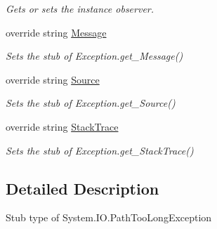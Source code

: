 \begin{DoxyCompactItemize}
\begin{DoxyCompactList}\small\item\em Gets or sets the instance observer.\end{DoxyCompactList}\item 
override string \hyperlink{class_system_1_1_i_o_1_1_fakes_1_1_stub_path_too_long_exception_ae62e5f86bb3b87c3ed0519297b35da17}{Message}
\begin{DoxyCompactList}\small\item\em Sets the stub of Exception.\-get\-\_\-\-Message()\end{DoxyCompactList}\item 
override string \hyperlink{class_system_1_1_i_o_1_1_fakes_1_1_stub_path_too_long_exception_a50004971c2fba15f5a66592850d06a0c}{Source}
\begin{DoxyCompactList}\small\item\em Sets the stub of Exception.\-get\-\_\-\-Source()\end{DoxyCompactList}\item 
override string \hyperlink{class_system_1_1_i_o_1_1_fakes_1_1_stub_path_too_long_exception_acef5dfe982faf43275445ec5680a50ab}{Stack\-Trace}
\begin{DoxyCompactList}\small\item\em Sets the stub of Exception.\-get\-\_\-\-Stack\-Trace()\end{DoxyCompactList}\end{DoxyCompactItemize}


\subsection{Detailed Description}
Stub type of System.\-I\-O.\-Path\-Too\-Long\-Exception



